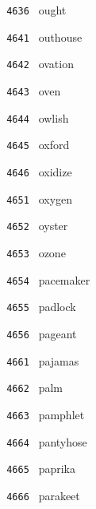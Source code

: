 \documentclass[11pt]{article}
\begin{document}
\begin{multicols}{6}
\noindent \texttt{ 4636 } ought  \par
\noindent \texttt{ 4641 } outhouse  \par
\noindent \texttt{ 4642 } ovation  \par
\noindent \texttt{ 4643 } oven  \par
\noindent \texttt{ 4644 } owlish  \par
\noindent \texttt{ 4645 } oxford  \par
\noindent \texttt{ 4646 } oxidize  \par
\noindent \texttt{ 4651 } oxygen  \par
\noindent \texttt{ 4652 } oyster  \par
\noindent \texttt{ 4653 } ozone  \par
\noindent \texttt{ 4654 } pacemaker  \par
\noindent \texttt{ 4655 } padlock  \par
\noindent \texttt{ 4656 } pageant  \par
\noindent \texttt{ 4661 } pajamas  \par
\noindent \texttt{ 4662 } palm  \par
\noindent \texttt{ 4663 } pamphlet  \par
\noindent \texttt{ 4664 } pantyhose  \par
\noindent \texttt{ 4665 } paprika  \par
\noindent \texttt{ 4666 } parakeet  \par
\end{multicols}
\end{document}
